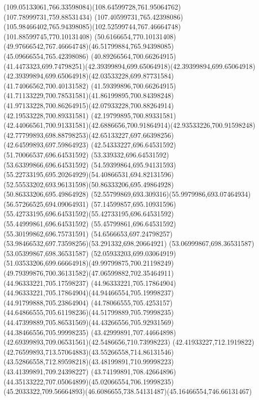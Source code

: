 {{		\curveto(109.05133061,766.33598084)(108.64599728,761.95064762)(107.78999731,759.88531434)
		\lineto(107.40599731,765.42398086)
		\curveto(105.98466402,765.94398085)(102.52599744,767.46664748)(101.88599745,770.10131408)
		\lineto(50.6166654,770.10131408)
		\curveto(49.97666542,767.46664748)(46.51799884,765.94398085)(45.09666554,765.42398086)
		\closepath
		\moveto(40.89266564,700.66264915)
		\curveto(41.4473323,699.74798251)(42.39399894,699.65064918)(42.39399894,699.65064918)
		\curveto(42.39399894,699.65064918)(42.03533228,699.87731584)(41.74066562,700.40131582)
		\curveto(41.59399896,700.66264915)(41.71133229,700.78531581)(41.86199895,700.84398248)
		\curveto(41.97133228,700.86264915)(42.07933228,700.88264914)(42.19533228,700.89331581)
		\lineto(42.19799895,700.89331581)
		\curveto(42.44066561,700.91331581)(42.6886656,700.91864914)(42.93533226,700.91598248)
		\curveto(42.77799893,698.88798253)(42.65133227,697.66398256)(42.64599893,697.59864923)
		\lineto(42.54333227,696.64531592)
		\lineto(51.70066537,696.64531592)
		\lineto(53.339332,696.64531592)
		\lineto(53.63399866,696.64531592)
		\curveto(54.59399864,695.94131593)(55.22733195,695.20264929)(54.40866531,694.82131596)
		\curveto(52.55533202,693.96131598)(50.86333206,695.49864928)(50.86333206,695.49864928)
		\curveto(52.55799869,693.309316)(55.9979986,693.07464934)(56.57266525,694.09064931)
		\curveto(57.14599857,695.10931596)(55.42733195,696.64531592)(55.42733195,696.64531592)
		\lineto(55.44999861,696.64531592)
		\lineto(55.45799861,696.64531592)
		\lineto(55.30199862,696.75731591)
		\curveto(54.6566653,697.24798257)(53.98466532,697.73598256)(53.291332,698.20664921)
		\lineto(53.06999867,698.36531587)
		\lineto(53.05399867,698.36531587)
		\curveto(52.05933203,699.03064919)(51.03533206,699.66664918)(49.99799875,700.21198249)
		\curveto(49.79399876,700.36131582)(47.06599882,702.35464911)(44.96333221,705.17598237)
		\lineto(44.96333221,705.17864904)
		\curveto(44.96333221,705.17864904)(44.94466554,705.19998237)(44.91799888,705.23864904)
		\curveto(44.78066555,705.4253157)(44.64866555,705.61198236)(44.51799889,705.79998235)
		\curveto(44.47399889,705.86531569)(44.43266556,705.92931569)(44.38466556,705.99998235)
		\curveto(43.42999891,707.44664898)(42.69399893,709.06531561)(42.5486656,710.73998223)
		\curveto(42.41933227,712.1919822)(42.76599893,713.57064883)(43.55266558,714.86131546)
		\curveto(43.52866558,712.89598218)(43.48199891,710.99998223)(43.41399891,709.24398227)
		\curveto(43.74199891,708.42664896)(44.35133222,707.05064899)(45.02066554,706.19998235)
		\curveto(45.2033322,709.56664893)(46.6086655,738.54131487)(45.16466554,746.66131467)
}}
